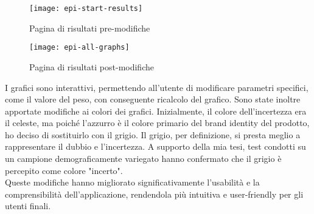 \begin{figure}[!ht] 
    \centering 
    \texttt{[image: epi-start-results]} 
    \caption{Pagina di risultati pre-modifiche}
\end{figure}

\begin{figure}[!ht] 
    \centering 
    \texttt{[image: epi-all-graphs]} 
    \caption{Pagina di risultati post-modifiche}
\end{figure}

I grafici sono interattivi, permettendo all'utente di modificare parametri specifici, come il valore del peso, con conseguente ricalcolo del grafico. Sono state inoltre apportate modifiche ai colori dei grafici. Inizialmente, il colore dell'incertezza era il celeste, ma poiché l'azzurro è il colore primario del brand identity del prodotto, ho deciso di sostituirlo con il grigio. Il grigio, per definizione, si presta meglio a rappresentare il dubbio e l'incertezza. A supporto della mia tesi, test condotti su un campione demograficamente variegato hanno confermato che il grigio è percepito come colore "incerto".\\

Queste modifiche hanno migliorato significativamente l'usabilità e la comprensibilità dell'applicazione, rendendola più intuitiva e user-friendly per gli utenti finali.